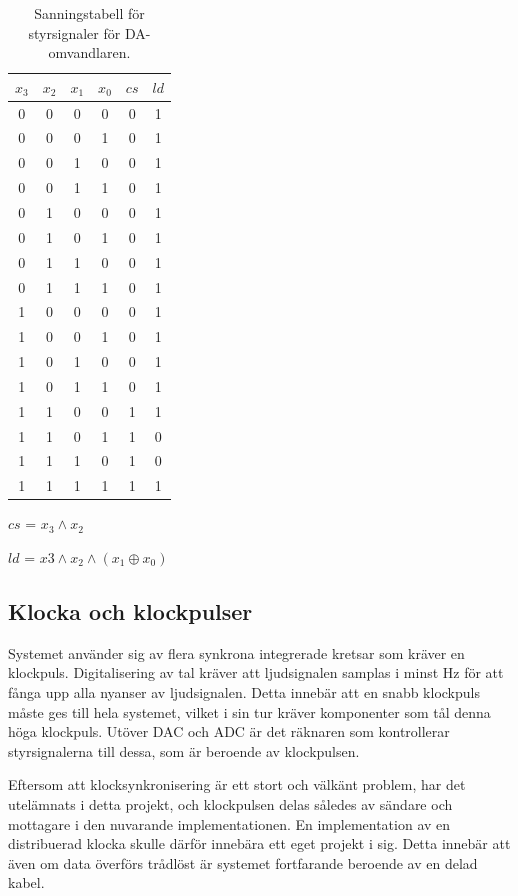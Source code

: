 \documentclass[a4paper,10pt]{article}
\begin{document}
\begin{table}
\centering
\begin{tabular}{|c c c c || c c |}
\hline
$x_3$ & $x_2$ & $x_1$ & $x_0$ & $cs$ & $ld$ \\\hline
0 & 0 & 0 & 0 & 0 & 1 \\
0 & 0 & 0 & 1 & 0 & 1 \\
0 & 0 & 1 & 0 & 0 & 1 \\
0 & 0 & 1 & 1 & 0 & 1 \\
0 & 1 & 0 & 0 & 0 & 1 \\
0 & 1 & 0 & 1 & 0 & 1 \\
0 & 1 & 1 & 0 & 0 & 1 \\
0 & 1 & 1 & 1 & 0 & 1 \\
1 & 0 & 0 & 0 & 0 & 1 \\
1 & 0 & 0 & 1 & 0 & 1 \\
1 & 0 & 1 & 0 & 0 & 1 \\
1 & 0 & 1 & 1 & 0 & 1 \\
1 & 1 & 0 & 0 & 1 & 1 \\
1 & 1 & 0 & 1 & 1 & 0 \\
1 & 1 & 1 & 0 & 1 & 0 \\
1 & 1 & 1 & 1 & 1 & 1 \\
\hline
\end{tabular}

$cs$ = $x_3 \wedge x_2$

$ld$ = $x3 \wedge x_2 \wedge (x_1 \oplus x_0)$

\caption{Sanningstabell för styrsignaler för DA-omvandlaren.}
\label{tab:dac}
\end{table}



\subsection{Klocka och klockpulser}

Systemet använder sig av flera synkrona integrerade kretsar som kräver en
klockpuls. Digitalisering av tal kräver att ljudsignalen samplas i minst 
 Hz för att fånga upp alla nyanser av ljudsignalen. Detta innebär att 
en snabb klockpuls måste ges till hela systemet, vilket i sin tur kräver 
komponenter som tål denna höga klockpuls. Utöver DAC och ADC är det räknaren som 
kontrollerar styrsignalerna till dessa, som är beroende av klockpulsen. 

Eftersom att klocksynkronisering är ett stort och välkänt problem, har det 
utelämnats i detta projekt, och klockpulsen delas således av sändare och 
mottagare i den nuvarande implementationen. En implementation av en distribuerad 
klocka skulle därför innebära ett eget projekt i sig. Detta innebär att även om 
data överförs trådlöst är systemet fortfarande beroende av en delad kabel. 
\end{document}
